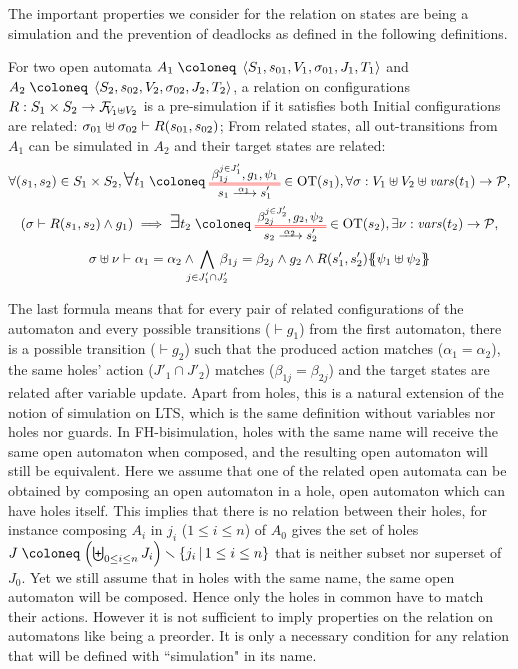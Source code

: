 \documentclass{article}
\begin{document}
The important properties we consider for the relation on states are being a simulation and the prevention of deadlocks as defined in the following definitions.
\begin{defi}
For two open automata \(A_1 \defobject \OAg[1]\) and \(A_2 \defobject \OAg[2]\), a relation on configurations \(R: S_1 \times S_2 \to \rformulas[V_1 \uplus V_2]\) is a pre-simulation if it satisfies both
 Initial configurations are related: \(\sigma_{01} \uplus \sigma_{02} \vdash R\mpar{s_{01}, s_{02}}\);
 From related states, all out-transitions from \(A_1\) can be simulated in \(A_2\) and their target states are related:
\begin{multline*}
	\forall \mpar{s_1, s_2} \in S_1 \times S_2, \bigsymb{\forall} t_1 \defobject \OTx{1}{}{1}{1} \in \fOT{s_1}, \forall \sigma: V_1 \uplus V_2 \uplus \fvars{t_1} \to \values, \\
	\mpar{\sigma \vdash R\mpar{s_1, s_2} \wedge g_1} \implies \bigsymb{\exists} t_2 \defobject \OTx{2}{}{2}{2} \in \fOT{s_2}, \exists \nu: \fvars{t_2} \to \values, \\
	\sigma \uplus \nu \vdash \alpha_1 = \alpha_2 \wedge \bigwedge_\subbox{j \in J'_1 \cap J'_2} \beta_{1j} = \beta_{2j} \wedge g_2 \wedge R\mpar{s'_1, s'_2}\psubst{\psi_1 \uplus \psi_2}
\end{multline*}
\end{defi}
The last formula means that for every pair of related configurations of the automaton and every possible transitions (\(\vdash g_1\)) from the first automaton, there is a possible transition (\(\vdash g_2\)) such that the produced action matches (\(\alpha_1 = \alpha_2\)), the same holes' action (\(J'_1 \cap J'_2\)) matches (\(\beta_{1j} = \beta_{2j}\)) and the target states are related after variable update. %
Apart from holes, this is a natural extension of the notion of simulation on LTS, which is the same definition without variables nor holes nor guards.
In FH-bisimulation, holes with the same name will receive the same open automaton when composed, and the resulting open automaton will still be equivalent.
Here we assume that one of the related open automata can be obtained by composing an open automaton in a hole, open automaton which can have holes itself.
This implies that there is no relation between their holes, for instance composing \(A_i\) in \(j_i\) (\(1 \leq i \leq n\)) of \(A_0\) gives the set of holes \(J \defobject \mpar{\biguplus_{0 \leq i \leq n} J_i} \setminus \mset{j_i}{1 \leq i \leq n} \) that is neither subset nor superset of \(J_0\).
Yet we still assume that in holes with the same name, the same open automaton will be composed.
Hence only the holes in common have to match their actions.
However it is not sufficient to imply properties on the relation on automatons like being a preorder.
It is only a necessary condition for any relation that will be defined with ``simulation" in its name.
\end{document}
